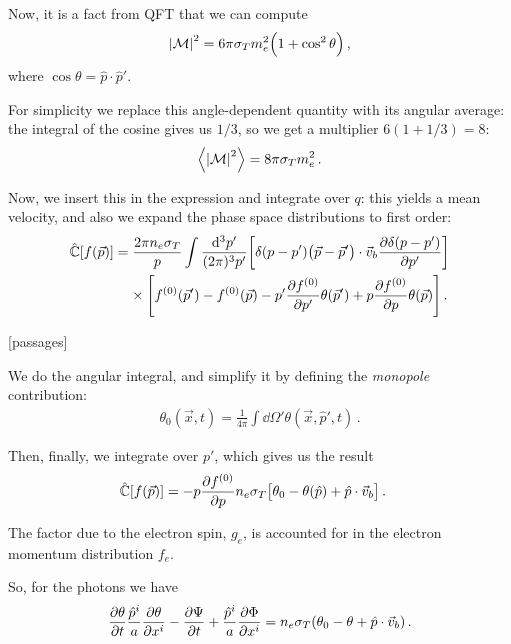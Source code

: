 \documentclass[main.tex]{subfiles}
\begin{document}
Now, it is a fact from QFT that we can compute 
%
\begin{align}
\abs{\mathcal{M}}^2 = 6 \pi \sigma_{T} m_e^2 \qty(1 + \cos^2\theta )
\,,
\end{align}
%
where \(\cos \theta = \hat{p} \cdot \hat{p}'\). 

For simplicity we replace this angle-dependent quantity with its angular average: the integral of the cosine gives us \(1/3\), so we get a multiplier \(6 ( 1+ 1/3) = 8 \): 
%
\begin{align}
\expval{ \abs{\mathcal{M}}^2} = 8 \pi \sigma_{T} m_e^2
\,.
\end{align}

Now, we insert this in the expression and integrate over \(q\): this yields a mean velocity, and also we expand the phase space distributions to first order:
%
\begin{subequations}
\begin{align}
\begin{split}
\hat{\mathbb{C}} [f(\vec{p})] &= 
\frac{2 \pi n_e \sigma_{T}}{p}
\int \frac{ \dd[3]{p'}}{(2\pi)^3 p'} 
\qty[ \delta (p - p') \qty(\vec{p} - \vec{p}') \cdot \vec{v}_b \pdv{ \delta (p - p')}{p'}] \\
&\phantom{=}\ 
\times \qty[ f^{(0)} (\vec{p}') - f^{(0)}(\vec{p}) - p' \pdv{f^{(0)}}{p'} \theta (\vec{p}') + p \pdv{f^{(0)}}{p} \theta (\vec{p})]
\,.
\end{split}
\end{align}
\end{subequations}
%

[passages]

We do the angular integral, and simplify it by defining the \emph{monopole} contribution:
%
\begin{align}
\theta_0 (\vec{x}, t) =  \frac{1}{4 \pi } \int \dd{\Omega'} 
\theta (\vec{x}, \hat{p}', t)
\,.
\end{align}

Then, finally, we integrate over \(p'\), which gives us the result 
%
\begin{align}
\hat{\mathbb{C}} [f(\vec{p})] &=
- p \pdv{f^{(0)}}{p} n_e \sigma_T 
\qty[\theta_0 - \theta (\hat{p}) + \hat{p} \cdot \vec{v}_b]
\,.
\end{align}

The factor due to the electron spin, \(g_e\), is accounted for in the  electron momentum distribution \(f_e\). 

So, for the photons we have 
%
\begin{align}
\pdv{\theta }{t} \frac{\hat{p}^{i}}{a} \pdv{\theta }{x^{i}}
- \pdv{\Psi }{t} + \frac{\hat{p}^{i}}{a} \pdv{\Phi }{x^{i}} 
= n_e \sigma_{T} \qty(\theta_0 - \theta + \hat{p}\cdot \vec{v}_b )
\,.
\end{align}
\end{document}
